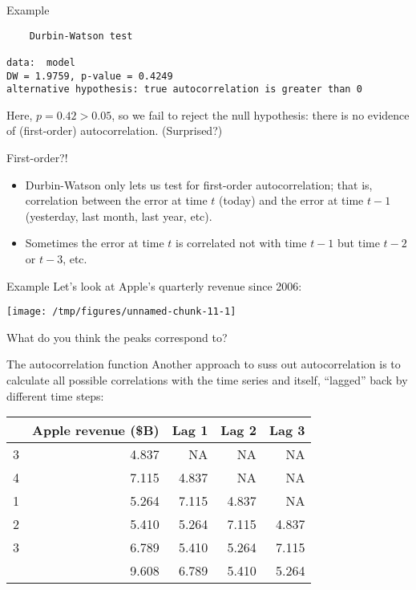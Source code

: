 \documentclass{beamer}\usepackage[]{graphicx}\usepackage[]{color}
\makeatletter
\def\maxwidth{ %
  \ifdim\Gin@nat@width>\linewidth
    \linewidth
  \else
    \Gin@nat@width
  \fi
}
\newenvironment{kframe}{%
 \def\at@end@of@kframe{}%
 \ifinner\ifhmode%
  \def\at@end@of@kframe{\end{minipage}}%
  \begin{minipage}{\columnwidth}%
 \fi\fi%
 \def\FrameCommand##1{\hskip\@totalleftmargin \hskip-\fboxsep
 \colorbox{shadecolor}{##1}\hskip-\fboxsep
     \hskip-\linewidth \hskip-\@totalleftmargin \hskip\columnwidth}%
 \MakeFramed {\advance\hsize-\width
   \@totalleftmargin\z@ \linewidth\hsize
   \@setminipage}}%
 {\par\unskip\endMakeFramed%
 \at@end@of@kframe}
\newenvironment{knitrout}{}{} %
\makeatother
\begin{document}
\begin{darkframes}
\begin{frame}[fragile]{Example}
\begin{knitrout}
\begin{kframe}
\begin{verbatim}
	Durbin-Watson test

data:  model
DW = 1.9759, p-value = 0.4249
alternative hypothesis: true autocorrelation is greater than 0
\end{verbatim}
\end{kframe}
\end{knitrout}
      Here, $p=0.42>0.05$, so we fail to reject the null hypothesis: there is no evidence of (first-order) autocorrelation. \pause (Surprised?)
    \end{frame}

    \begin{frame}{First-order?!}
      \begin{itemize}
        \item Durbin-Watson only lets us test for \alert{first-order} autocorrelation; that is, correlation between the error at time $t$ (today) and the error at time $t-1$ (yesterday, last month, last year, etc).
        \item Sometimes the error at time $t$ is correlated not with time $t-1$ but time $t-2$ or $t-3$, etc.
      \end{itemize}
    \end{frame}

    \begin{frame}[fragile]{Example}
      Let's look at Apple's quarterly revenue since 2006:

\begin{knitrout}
\color{fgcolor}
\texttt{[image: /tmp/figures/unnamed-chunk-11-1]} 

\end{knitrout}

      What do you think the peaks correspond to?
    \end{frame}

    \begin{frame}{The autocorrelation function}
      Another approach to suss out autocorrelation is to calculate all possible correlations with the time series and itself, ``lagged'' back by different time steps:

      \bigskip

      \begin{center}
\begin{knitrout}
\color{fgcolor}
\begin{tabular}{lrrrr}
\toprule
  & Apple revenue (\$B) & Lag 1 & Lag 2 & Lag 3\\
\midrule
3 & 4.837 & NA & NA & NA\\
4 & 7.115 & 4.837 & NA & NA\\
1 & 5.264 & 7.115 & 4.837 & NA\\
2 & 5.410 & 5.264 & 7.115 & 4.837\\
3 & 6.789 & 5.410 & 5.264 & 7.115\\
\addlinespace
4 & 9.608 & 6.789 & 5.410 & 5.264\\
\bottomrule
\end{tabular}



\end{knitrout}
\end{center}
\end{frame}
\end{darkframes}
\end{document}
